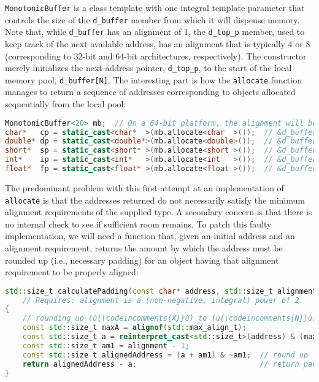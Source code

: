 \noindent \texttt{MonotonicBuffer} is a class template with one integral template
parameter that controls the size of the \texttt{d\_buffer} member from
which it will dispense memory. Note that, while \texttt{d\_buffer} has
an alignment of 1, the \texttt{d\_top\_p} member, used to keep track of
the next available address, has an alignment that is typically 4 or 8
(corresponding to 32-bit and 64-bit architectures, respectively). The
constructor merely initializes the next-address pointer,
\texttt{d\_top\_p}, to the start of the local memory pool,
\texttt{d\_buffer[N]}. The interesting part is how the \texttt{allocate}
function manages to return a sequence of addresses corresponding to
objects allocated sequentially from the local pool:

\begin{lstlisting}[language=C++]
MonotonicBuffer<20> mb;  // On a 64-bit platform, the alignment will be 8.
char*   cp = static_cast<char*  >(mb.allocate<char  >());  // &d_buffer[ 0]
double* dp = static_cast<double*>(mb.allocate<double>());  // &d_buffer[ 1]
short*  sp = static_cast<short* >(mb.allocate<short >());  // &d_buffer[ 9]
int*    ip = static_cast<int*   >(mb.allocate<int   >());  // &d_buffer[11]
float*  fp = static_cast<float* >(mb.allocate<float >());  // &d_buffer[15]
\end{lstlisting}

\noindent The predominant problem with this first attempt at an implementation of
\texttt{allocate} is that the addresses returned do not necessarily
satisfy the minimum alignment requirements of the supplied type. A
secondary concern is that there is no internal check to see if
sufficient room remains. To patch this faulty implementation,
we will need a function that, given an initial address and an alignment
requirement, returns the amount by which the address must be rounded up
(i.e., necessary padding) for an object having that alignment
requirement to be properly aligned:

\begin{lstlisting}[language=C++]
std::size_t calculatePadding(const char* address, std::size_t alignment)
    // Requires: alignment is a (non-negative, integral) power of 2.
{
    // rounding up (ù{\codeincomments{X}}ù) to (ù{\codeincomments{N}}ù) (where (ù{\codeincomments{N}}ù) is a power of 2): (ù{\codeincomments{(x + N - 1) \& \textasciitilde(N - 1)}}ù)
    const std::size_t maxA = alignof(std::max_align_t);
    const std::size_t a = reinterpret_cast<std::size_t>(address) & (maxA - 1);
    const std::size_t am1 = alignment - 1;
    const std::size_t alignedAddress = (a + am1) & ~am1;  // round up
    return alignedAddress - a;                            // return padding
}
\end{lstlisting}

